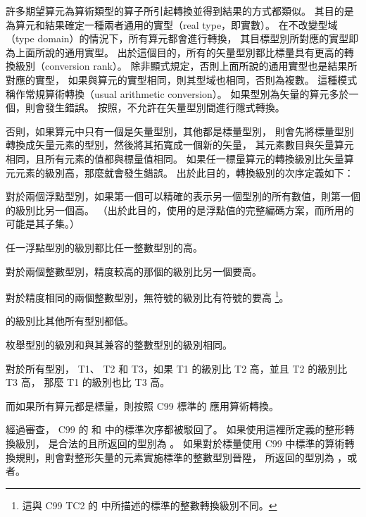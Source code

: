 許多期望算元為算術類型的算子所引起轉換並得到結果的方式都類似。
其目的是為算元和結果確定一種兩者通用的實型（real type，即實數）。
在不改變型域（type domain）的情況下，所有算元都會進行轉換，
其目標型別所對應的實型即為上面所說的通用實型。
出於這個目的，所有的矢量型別都比標量具有更高的轉換級別（conversion rank）。
除非顯式規定，否則上面所說的通用實型也是結果所對應的實型，
如果與算元的實型相同，則其型域也相同，否則為複數。
這種模式稱作常規算術轉換（usual arithmetic conversion）。
如果型別為矢量的算元多於一個，則會發生錯誤。
按照，不允許在矢量型別間進行隱式轉換。

否則，如果算元中只有一個是矢量型別，其他都是標量型別，
則會先將標量型別轉換成矢量元素的型別，然後將其拓寬成一個新的矢量，
其元素數目與矢量算元相同，且所有元素的值都與標量值相同。
如果任一標量算元的轉換級別比矢量算元元素的級別高，那麼就會發生錯誤。
出於此目的，轉換級別的次序定義如下：
\startigNum
\item 對於兩個浮點型別，如果第一個可以精確的表示另一個型別的所有數值，則第一個的級別比另一個高。
（出於此目的，使用的是浮點值的完整編碼方案，而所用的可能是其子集。）

\item 任一浮點型別的級別都比任一整數型別的高。

\item 對於兩個整數型別，精度較高的那個的級別比另一個要高。

\item 對於精度相同的兩個整數型別，無符號的級別比有符號的要高
\footnote{這與 C99 TC2 的{} 中所描述的標準的整數轉換級別不同。}。

\item {} 的級別比其他所有型別都低。

\item 枚舉型別的級別和與其兼容的整數型別的級別相同。

\item 對於所有型別， T1、 T2 和 T3，如果 T1 的級別比 T2 高，並且 T2 的級別比 T3 高，
那麼 T1 的級別也比 T3 高。
\stopigNum

而如果所有算元都是標量，則按照 C99 標準的{} 應用算術轉換。

\startnotepar
經過審查， C99 的{} 和{} 中的標準次序都被駁回了。
如果使用這裡所定義的整形轉換級別，  是合法的且所返回的型別為 。
如果對於標量使用 C99 中標準的算術轉換規則，則會對整形矢量的元素實施標準的整數型別晉陞，
  所返回的型別為 ，或者。
\stopnotepar

